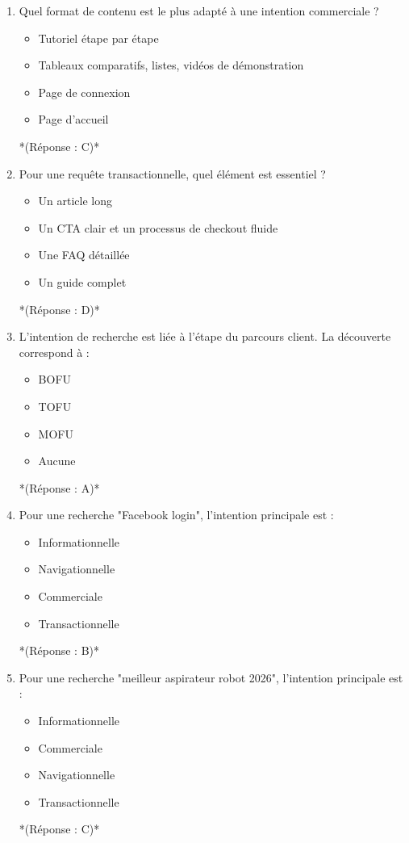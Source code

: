 \documentclass[12pt,a4paper,twoside]{report}
\begin{document}
\begin{enumerate}
\item Quel format de contenu est le plus adapté à une intention commerciale ?
\begin{itemize}
\item[A)] Tutoriel étape par étape
\item[B)] Tableaux comparatifs, listes, vidéos de démonstration
\item[C)] Page de connexion
\item[D)] Page d'accueil
\end{itemize}
*(Réponse : C)*

\item Pour une requête transactionnelle, quel élément est essentiel ?
\begin{itemize}
\item[A)] Un article long
\item[B)] Un CTA clair et un processus de checkout fluide
\item[C)] Une FAQ détaillée
\item[D)] Un guide complet
\end{itemize}
*(Réponse : D)*

\item L'intention de recherche est liée à l'étape du parcours client. La découverte correspond à :
\begin{itemize}
\item[A)] BOFU
\item[B)] TOFU
\item[C)] MOFU
\item[D)] Aucune
\end{itemize}
*(Réponse : A)*

\item Pour une recherche "Facebook login", l'intention principale est :
\begin{itemize}
\item[A)] Informationnelle
\item[B)] Navigationnelle
\item[C)] Commerciale
\item[D)] Transactionnelle
\end{itemize}
*(Réponse : B)*

\item Pour une recherche "meilleur aspirateur robot 2026", l'intention principale est :
\begin{itemize}
\item[A)] Informationnelle
\item[B)] Commerciale
\item[C)] Navigationnelle
\item[D)] Transactionnelle
\end{itemize}
*(Réponse : C)*


\end{enumerate}
\end{document}

